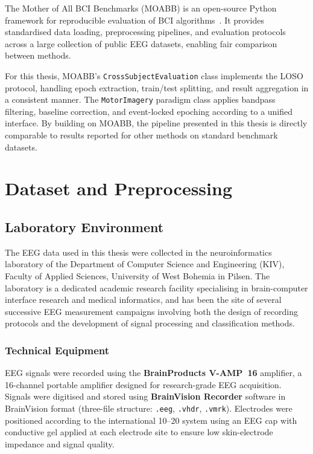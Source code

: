\documentclass[english, bc, kiv, he, iso690alph, pdf]{fasthesis}
\begin{document}
The Mother of All BCI Benchmarks (MOABB) is an open-source Python framework for reproducible evaluation of BCI algorithms~\cite{jayaram2018moabb}. It provides standardised data loading, preprocessing pipelines, and evaluation protocols across a large collection of public EEG datasets, enabling fair comparison between methods.

For this thesis, MOABB's \texttt{Cross\allowbreak Subject\allowbreak Evaluation} class implements the LOSO protocol, handling epoch extraction, train/test splitting, and result aggregation in a consistent manner. The \texttt{MotorImagery} paradigm class applies bandpass filtering, baseline correction, and event-locked epoching according to a unified interface. By building on MOABB, the pipeline presented in this thesis is directly comparable to results reported for other methods on standard benchmark datasets.

\chapter{Dataset and Preprocessing}

\section{Laboratory Environment}

The EEG data used in this thesis were collected in the neuroinformatics laboratory of the Department of Computer Science and Engineering (KIV), Faculty of Applied Sciences, University of West Bohemia in Pilsen. The laboratory is a dedicated academic research facility specialising in brain-computer interface research and medical informatics, and has been the site of several successive EEG measurement campaigns involving both the design of recording protocols and the development of signal processing and classification methods.

\subsection{Technical Equipment}

EEG signals were recorded using the \textbf{BrainProducts V-AMP~16} amplifier, a 16-channel portable amplifier designed for research-grade EEG acquisition. Signals were digitised and stored using \textbf{BrainVision Recorder} software in BrainVision format (three-file structure: \texttt{.eeg}, \texttt{.vhdr}, \texttt{.vmrk}). Electrodes were positioned according to the international 10--20 system using an EEG cap with conductive gel applied at each electrode site to ensure low skin-electrode impedance and signal quality.
\end{document}

